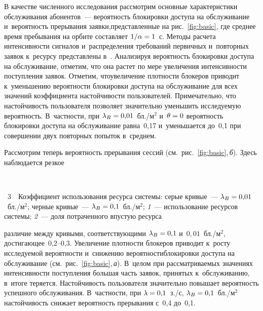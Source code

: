 \begin{multicols}{2}
В качестве численного исследования рас\-смот\-рим основные характеристики 
обслуживания абонентов~--- ве\-ро\-ят\-ность блокировки до\-сту\-па на обслуживание 
и~ве\-ро\-ят\-ность прерывания заявки,\linebreak пред\-став\-лен\-ные на рис.~\ref{fig:basic}, где 
сред\-нее время пребывания на орбите со\-став\-ля\-ет $1/\alpha\hm=1$~с. \mbox{Методы} расчета 
ин\-тен\-сив\-ности сигналов и~распределения требований первичных и~повторных заявок 
к~ресурсу пред\-став\-ле\-ны в~\cite{begishev2019estimate}. Анализируя \mbox{ве\-ро\-ят\-ность} 
блокировки до\-сту\-па на обслуживание, отметим, что она рас\-тет по мере увеличения 
ин\-тен\-сив\-ности по\-ступ\-ле\-ния заявок. Отметим, что\linebreak увеличение плот\-ности блокеров 
приводит к~уменьшению ве\-ро\-ят\-ности блокировки до\-сту\-па на обслуживание для всех 
значений коэффициента на\-стой\-чи\-вости пользователей. Примечательно, что 
\mbox{на\-стой\-чи\-вость} пользователя поз\-во\-ля\-ет значительно уменьшить ис\-сле\-ду\-емую 
ве\-ро\-ят\-ность. В~част\-ности, при $\lambda_B\hm=0{,}01$~бл./м$^2$ и~$\theta\hm=0$ 
ве\-ро\-ят\-ность блокировки до\-сту\-па на обслуживание рав\-на~0,17 и~уменьшается до~0,1 при 
совершении двух повторных попыток в~сред\-нем.


Рассмотрим теперь ве\-ро\-ят\-ность прерывания сессий (см.\ рис.~\ref{fig:basic},\,\textit{б}). 
Здесь наблюдается рез\-кое\linebreak\vspace*{-12pt}

{ \begin{center}  %
 \vspace*{-4pt}
    \mbox{%
\epsfxsize=78.875mm 
}

\end{center}

\vspace*{-3pt}

\noindent
{{\figurename~3}\ \ \small{Коэффициент использования ресурса сис\-те\-мы: серые кривые~--- $\lambda_B\hm= 0{,}01$~бл./м$^2$;
черные кривые~--- $\lambda_B\hm= 0{,}1$~бл./м$^2$;
\textit{1}~--- использование ресурсов сис\-те\-мы;
\textit{2}~--- доля потраченного впус\-тую ресурса}}}

\vspace*{12pt}

\noindent
 различие меж\-ду кривыми, со\-от\-вет\-ст\-ву\-ющи\-ми 
$\lambda_B\hm=0{,}1$ и~$0{,}01$~бл./м$^2$, до\-сти\-га\-ющее~0,2--0,3. 
Увеличение плот\-ности блокеров приводит к~рос\-ту ис\-сле\-ду\-емой ве\-ро\-ят\-ности 
и~снижению ве\-ро\-ят\-ности\linebreak блокировки до\-сту\-па на обслуживание (см.\ рис.~\ref{fig:basic},\,\textit{а}). 
В~целом при рас\-смат\-ри\-ва\-емых значениях ин\-тен\-сив\-ности 
по\-ступ\-ле\-ния большая часть заявок, принятых к~обслуживанию, в~итоге теряется. 
На\-стой\-чи\-вость пользователя значительно повышает ве\-ро\-ят\-ность успеш\-но\-го 
обслуживания. В~част\-ности, при $\lambda\hm=0{,}1$~з./с, $\lambda_B\hm=0{,}1$~бл./м$^2$ 
на\-стой\-чи\-вость снижает ве\-ро\-ят\-ность прерывания с~0,4 до~0,1. 
{

}
\end{multicols}
